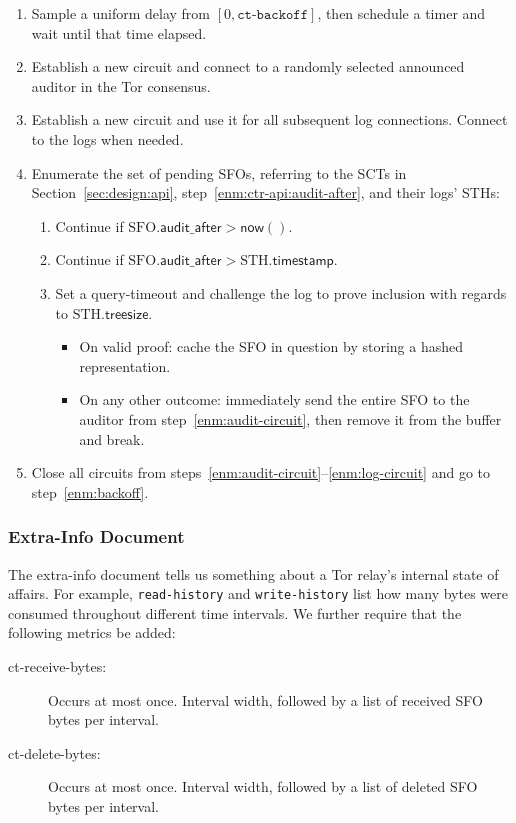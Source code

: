 \begin{enumerate}
	\item\label{enm:backoff} Sample a uniform delay from
			$[0, \texttt{ct-backoff}]$,
		then schedule a timer and wait until that time elapsed.
	\item\label{enm:audit-circuit} Establish a new circuit and connect to a
		randomly selected announced auditor in the Tor consensus.
	\item\label{enm:log-circuit} Establish a new circuit and use it for all
		subsequent log connections.  Connect to the logs when needed.
	\item\label{enm:audit-loop} Enumerate the set of pending SFOs, referring to
		the SCTs in Section~\ref{sec:design:api},
		step~\ref{enm:ctr-api:audit-after}, and their logs' STHs:
		\begin{enumerate}
			\item\label{enm:audit-loop:wait-sct} Continue if
				$\textrm{SFO}.\mathsf{audit\_after} > \mathsf{now}()$.
			\item\label{enm:audit-loop:wait-sth} Continue if
				$\textrm{SFO}.\mathsf{audit\_after} >
				\textrm{STH}.\mathsf{timestamp}$.
			\item\label{enm:audit-loop:challenge} Set a query-timeout and
				challenge the log to prove inclusion with regards to
				$\textrm{STH}.\mathsf{treesize}$.
				\begin{itemize}
					\item\label{enm:audit-loop:challenge:success} On valid
						proof: cache the SFO in question by storing a hashed
						representation.
					\item\label{enm:audit-loop:challenge:fail} On any other
						outcome: immediately send the entire SFO to the auditor
						from step~\ref{enm:audit-circuit}, then remove it from
						the buffer and break.
				\end{itemize}
		\end{enumerate}
	\item\label{enm:teardown} Close all circuits from
		steps~\ref{enm:audit-circuit}--\ref{enm:log-circuit} and go to
		step~\ref{enm:backoff}.
\end{enumerate}

\subsubsection{Extra-Info Document}
The extra-info document tells us something about a Tor relay's internal state of
affairs.  For example, \texttt{read-history} and \texttt{write-history} list how
many bytes were consumed throughout different time intervals.  We further
require that the following metrics be added:
\begin{description}
	\item[ct-receive-bytes:] Occurs at most once.  Interval width, followed by a
		list of received SFO bytes per interval.
	\item[ct-delete-bytes:] Occurs at most once.  Interval width, followed by a
		list of deleted SFO bytes per interval.
\end{description}

